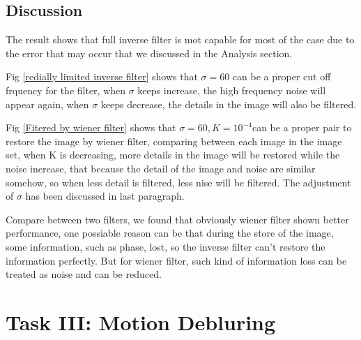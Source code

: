 \documentclass[
	12pt, %
]{style/fphw}
\begin{document}
\subsection*{Discussion}

The result shows that full inverse filter is mot capable for most of the case due to the error that may occur that we discussed in the Analysis section. 

Fig \ref{redially limited inverse filter} shows that $\sigma=60$ can be a proper cut off frquency for the filter, when $\sigma$ keeps increase, the high frequency noise will appear again, when $\sigma$ keeps decrease, the details in the image will also be filtered.

Fig \ref{Fitered by wiener filter} shows that $\sigma=60, K = 10^{-4}$can be a proper pair to restore the image by wiener filter, comparing between each image in the image set, when K is decreasing, more details in the image will be restored while the noise increase, that because the detail of the image and noise are similar somehow, so when less detail is filtered, less nise will be filtered. The adjustment of $\sigma$ has been discussed in last paragraph. 

Compare between two filters, we found that obviously wiener filter shown better performance, one possiable reason can be that during the store of the image, some information, such as phase, lost, so the inverse filter can't restore the information perfectly. But for wiener filter, such kind of information loss can be treated as noise and can be reduced.



\section*{Task III: Motion Debluring}
\end{document}
